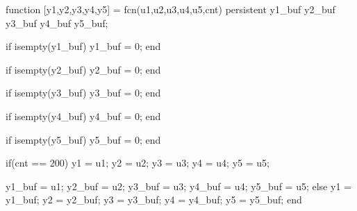 
\begin{mylisting}[language=c,caption=セル電圧バランス制御キャリア同期モジュール,label=appC_Cell_Balance]

function [y1,y2,y3,y4,y5] = fcn(u1,u2,u3,u4,u5,cnt)
persistent y1\_buf y2\_buf y3\_buf y4\_buf y5\_buf;

if isempty(y1\_buf)
    y1\_buf = 0;
end

if isempty(y2\_buf)
    y2\_buf = 0;
end

if isempty(y3\_buf)
    y3\_buf = 0;
end

if isempty(y4\_buf)
    y4\_buf = 0;
end

if isempty(y5\_buf)
    y5\_buf = 0;
end

if(cnt == 200)
    y1 = u1;
    y2 = u2;
    y3 = u3;
    y4 = u4;
    y5 = u5;
    
    y1\_buf = u1;
    y2\_buf = u2;
    y3\_buf = u3;
    y4\_buf = u4;
    y5\_buf = u5;
else
    y1 = y1\_buf;
    y2 = y2\_buf;
    y3 = y3\_buf;
    y4 = y4\_buf;
    y5 = y5\_buf;
end


\end{mylisting}

